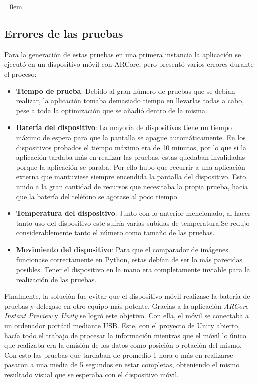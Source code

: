 \parindent=0em
\subsection{Errores de las pruebas}
\noindent

Para la generación de estas pruebas en una primera instancia la aplicación se ejecutó en un dispositivo móvil con ARCore, pero presentó varios errores durante el proceso:

\begin{itemize}
    \item \textbf{Tiempo de prueba}: Debido al gran número de pruebas que se debían realizar, la aplicación tomaba demasiado tiempo en llevarlas todas a cabo, pese a toda la optimización que se añadió dentro de la misma.
    
    \item \textbf{Batería del dispositivo}: La mayoría de dispositivos tiene un tiempo máximo de espera para que la pantalla se apague automáticamente. En los dispositivos probados el tiempo máximo era de 10 minutos, por lo que si la aplicación tardaba más en realizar las pruebas, estas quedaban invalidadas porque la aplicación se paraba. Por ello hubo que recurrir a una aplicación externa que mantuviese siempre encendida la pantalla del dispositivo. Esto, unido a la gran cantidad de recursos que necesitaba la propia prueba, hacía que la batería del teléfono se agotase al poco tiempo.
    
    \item \textbf{Temperatura del dispositivo}: Junto con lo anterior mencionado, al hacer tanto uso del dispositivo este sufría varias subidas de temperatura.Se redujo considerablemente tanto el número como tamaño de las pruebas.
    
    \item \textbf{Movimiento del dispositivo}: Para que el comparador de imágenes funcionase correctamente en Python, estas debían de ser lo más parecidas posibles. Tener el dispositivo en la mano era completamente inviable para la realización de las pruebas.
    
\end{itemize}

Finalmente, la solución fue evitar que el dispositivo móvil realizase la batería de pruebas y delegase en otro equipo más potente. Gracias a la aplicación \textit{ARCore Instant Preview} y \textit{Unity} se logró este objetivo. Con ella, el móvil se conectaba a un ordenador portátil mediante USB. Este, con el proyecto de Unity abierto, hacía todo el trabajo de procesar la información mientras que el móvil lo único que realizaba era la emisión de los datos como posición o rotación del mismo. Con esto las pruebas que tardaban de promedio 1 hora o más en realizarse pasaron a una media de 5 segundos en estar completas, obteniendo el mismo resultado visual que se esperaba con el dispositivo móvil. \\
